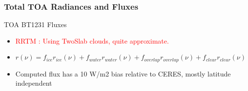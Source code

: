 \documentclass[10pt,t]{beamer}
\begin{document}


\begin{frame}
  \frametitle{Total TOA Radiances and Fluxes}

  \hspace{0.50in} TOA BT1231 \hspace{1.75in} Fluxes \\
  \begin{center}
  \end{center}

  \begin{itemize}
  \item \textcolor{red}{RRTM : Using TwoSlab clouds, quite approximate.}
  \item \begin{small}$r(\nu) = f_{ice} r_{ice}(\nu) + f_{water} r_{water}(\nu) +
    f_{overlap} r_{overlap}(\nu) + f_{clear} r_{clear}(\nu)$ \end{small}
  \item Computed flux has a 10 W/m2 bias relative to CERES, mostly latitude independent
  \end{itemize}
\end{frame}
\end{document}
